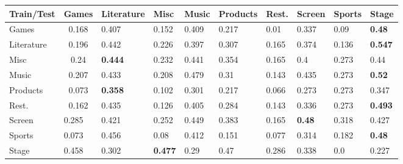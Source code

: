 \begin{table}[]
	\begin{tabular}{|l|c|l|l|l|l|l|l|l|l|}
		\hline
		Train/Test & \multicolumn{1}{l|}{Games} & Literature     & Misc           & Music & Products & Rest. & Screen        & Sports & Stage          \\ \hline
		Games      & 0.168                      & 0.407          & 0.152          & 0.409 & 0.217    & 0.01  & 0.337         & 0.09   & \textbf{0.48}  \\ \hline
		Literature & 0.196                      & 0.442          & 0.226          & 0.397 & 0.307    & 0.165 & 0.374         & 0.136  & \textbf{0.547} \\ \hline
		Misc       & 0.24                       & \textbf{0.444} & 0.232          & 0.441 & 0.354    & 0.165 & 0.4           & 0.273  & 0.44           \\ \hline
		Music      & 0.207                      & 0.433          & 0.208          & 0.479 & 0.31     & 0.143 & 0.435         & 0.273  & \textbf{0.52}  \\ \hline
		Products   & 0.073                      & \textbf{0.358} & 0.102          & 0.301 & 0.217    & 0.066 & 0.273         & 0.273  & 0.347          \\ \hline
		Rest.      & 0.162                      & 0.435          & 0.126          & 0.405 & 0.284    & 0.143 & 0.336         & 0.273  & \textbf{0.493} \\ \hline
		Screen     & \multicolumn{1}{l|}{0.285} & 0.421          & 0.252          & 0.449 & 0.383    & 0.165 & \textbf{0.48} & 0.318  & 0.427          \\ \hline
		Sports     & \multicolumn{1}{l|}{0.073} & 0.456          & 0.08           & 0.412 & 0.151    & 0.077 & 0.314         & 0.182  & \textbf{0.48}  \\ \hline
		Stage      & \multicolumn{1}{l|}{0.458} & 0.302          & \textbf{0.477} & 0.29  & 0.47     & 0.286 & 0.338         & 0.0    & 0.227          \\ \hline
	\end{tabular}
\end{table}

